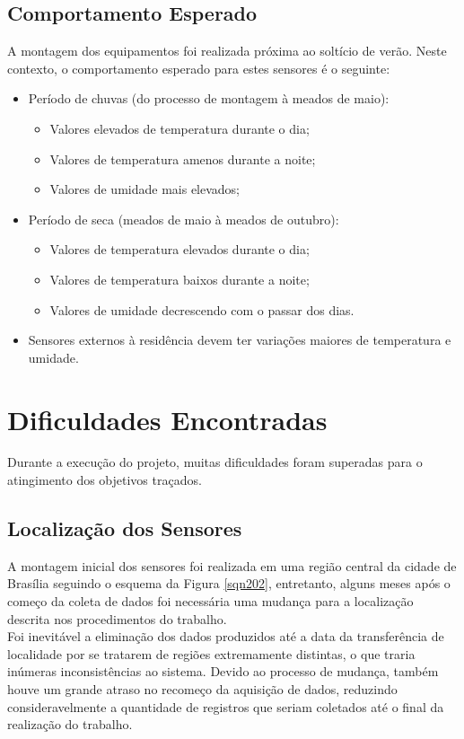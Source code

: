 \subsection{Comportamento Esperado}
\quad A montagem dos equipamentos foi realizada próxima ao soltício de verão. Neste contexto, o comportamento esperado para estes sensores é o seguinte:
\begin{itemize}
  \item Período de chuvas (do processo de montagem à meados de maio):
  \begin{itemize}
    \item Valores elevados de temperatura durante o dia;
    \item Valores de temperatura amenos durante a noite;
    \item Valores de umidade mais elevados;

  \end{itemize}
  \item Período de seca (meados de maio à meados de outubro):
  \begin{itemize}
    \item Valores de temperatura elevados durante o dia;
    \item Valores de temperatura baixos durante a noite;
    \item Valores de umidade decrescendo com o passar dos dias.
  \end{itemize}
  \item Sensores externos à residência devem ter variações maiores de temperatura e umidade.
\end{itemize}

\section{Dificuldades Encontradas}
\quad Durante a execução do projeto, muitas dificuldades foram superadas para o atingimento dos objetivos traçados.
\subsection{Localização dos Sensores}
\quad A montagem inicial dos sensores foi realizada em uma região central da cidade de Brasília seguindo o esquema da Figura \ref{sqn202}, entretanto, alguns meses após o começo da coleta de dados foi necessária uma mudança para a localização descrita nos procedimentos do trabalho.
\\\null \quad Foi inevitável a eliminação dos dados produzidos até a data da transferência de localidade por se tratarem de regiões extremamente distintas, o que traria inúmeras inconsistências ao sistema. Devido ao processo de mudança, também houve um grande atraso no recomeço da aquisição de dados, reduzindo consideravelmente a quantidade de registros que seriam coletados até o final da realização do trabalho.

